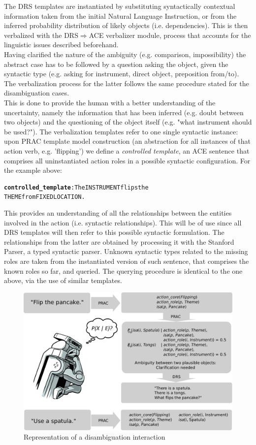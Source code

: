 \documentclass[oribibl]{llncs}
\begin{document}
The DRS templates are instantiated by substituting 
syntactically contextual information taken from the initial Natural 
Language Instruction, or from the inferred probability distribution 
of likely objects (i.e. dependencies). This is then verbalized with 
the DRS$\Rightarrow$ACE verbalizer module, process that accounts for 
the linguistic issues described beforehand.\\ Having clarified the 
nature of the ambiguity (e.g. comparison, impossibility) the 
abstract case has to be followed by a question asking the object, 
given the syntactic type (e.g. asking for instrument, direct object, 
preposition from/to). The verbalization process for the latter 
follows the same procedure stated for the disambiguation cases. \\ 
This is done to provide the human with a better understanding of the 
uncertainty, namely the information that has been inferred (e.g. 
doubt between two objects) and the questioning of the object itself 
(e.g. "what instrument should be used?"). The verbalization 
templates refer to one single syntactic instance: upon PRAC template 
model construction (an abstraction for all instances of that action 
verb, e.g. 'flipping') we define a \textit{controlled template}, an 
ACE sentence that comprises all uninstantiated action roles in a 
possible syntactic configuration. For the example above: 

{\small 
\begin{alltt} \textbf{controlled_template}: The INSTRUMENT flips the 
THEME from FIXEDLOCATION. \end{alltt} }

This provides an understanding of all the relationships between 
the entities involved in the action (i.e. syntactic relationships). 
This will be of use since all DRS templates will then refer to this 
possible syntactic formulation. The relationships from the latter 
are obtained by processing it with the Stanford Parser\cite
{mcdm08b}, a typed syntactic parser. Unknown syntactic types related 
to the missing roles are taken from the instantiated version of such 
sentence, that comprises the known roles so far, and queried. The 
querying procedure is identical to the one above, via the use of 
similar templates.
\begin{figure}[t]
\centering
\includegraphics[width=0.9\columnwidth]{results.pdf}
\caption{Representation of a disambiguation interaction}
\label{fig:pipeline}
\end{figure} 
\end{document}
